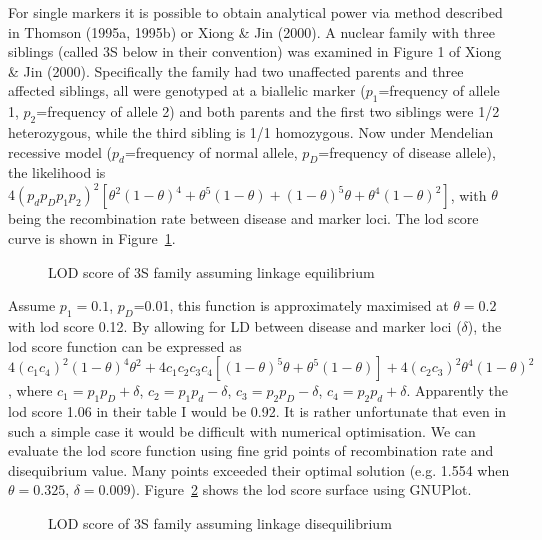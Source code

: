 For single markers it is possible to obtain analytical power via method
described in Thomson (1995a, 1995b) or Xiong \& Jin (2000).  A nuclear family
with three siblings (called 3S below in their convention) was examined in
Figure 1 of Xiong \& Jin (2000).  Specifically the family had two unaffected
parents and three affected siblings, all were genotyped at a biallelic marker
($p_1$=frequency of allele 1, $p_2$=frequency of allele 2) and both parents and
the first two siblings were 1/2 heterozygous, while the third sibling is 1/1
homozygous.  Now under Mendelian recessive model ($p_d$=frequency of normal
allele, $p_D$=frequency of disease allele), the likelihood is
$4(p_dp_Dp_1p_2)^2[\theta^2(1-\theta)^4+\theta^5(1-\theta)+(1-\theta)^5\theta+
\theta^4(1-\theta)^2]$, with $\theta$ being the recombination rate between
disease and marker loci.  The lod score curve is shown in Figure~\ref{3slod}.

\begin{figure}
\centerline{}
\caption{LOD score of 3S family assuming linkage equilibrium\label{3slod}}
\end{figure}

Assume $p_1=0.1$, $p_D$=0.01, this function is approximately maximised at
$\theta=0.2$ with lod score 0.12.  By allowing for LD between disease and
marker loci ($\delta$), the lod score function can be expressed as $4(c_1
c_4)^2 (1-\theta)^4 \theta^2+4c_1 c_2 c_3 c_4 [(1-\theta)^5 \theta+\theta^5
(1-\theta)]+4(c_2 c_3)^2 \theta^4 (1-\theta)^2$, where $c_1=p_1 p_D+\delta$,
$c_2=p_1 p_d-\delta$, $c_3=p_2 p_D-\delta$, $c_4=p_2 p_d+\delta$.  Apparently
the lod score 1.06 in their table I would be 0.92.  It is rather unfortunate
that even in such a simple case it would be difficult with numerical
optimisation.  We can evaluate the lod score function using fine grid points of
recombination rate and disequibrium value.  Many points exceeded their optimal
solution (e.g.  1.554 when $\theta=0.325$, $\delta=0.009$).
Figure~\ref{3slod3d} shows the lod score surface using GNUPlot.

\begin{figure}
\centerline{}
\caption{LOD score of 3S family assuming linkage disequilibrium\label{3slod3d}}
\end{figure}

